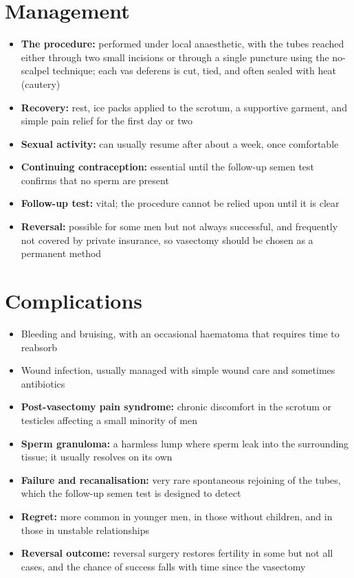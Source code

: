 \section*{Management}
\begin{itemize}
    \item \textbf{The procedure:} performed under local anaesthetic, with the tubes reached either through two small incisions or through a single puncture using the no-scalpel technique; each vas deferens is cut, tied, and often sealed with heat (cautery)
    \item \textbf{Recovery:} rest, ice packs applied to the scrotum, a supportive garment, and simple pain relief for the first day or two
    \item \textbf{Sexual activity:} can usually resume after about a week, once comfortable
    \item \textbf{Continuing contraception:} essential until the follow-up semen test confirms that no sperm are present
    \item \textbf{Follow-up test:} vital; the procedure cannot be relied upon until it is clear
    \item \textbf{Reversal:} possible for some men but not always successful, and frequently not covered by private insurance, so vasectomy should be chosen as a permanent method
\end{itemize}

\section*{Complications}
\begin{itemize}
    \item Bleeding and bruising, with an occasional haematoma that requires time to reabsorb
    \item Wound infection, usually managed with simple wound care and sometimes antibiotics
    \item \textbf{Post-vasectomy pain syndrome:} chronic discomfort in the scrotum or testicles affecting a small minority of men
    \item \textbf{Sperm granuloma:} a harmless lump where sperm leak into the surrounding tissue; it usually resolves on its own
    \item \textbf{Failure and recanalisation:} very rare spontaneous rejoining of the tubes, which the follow-up semen test is designed to detect
    \item \textbf{Regret:} more common in younger men, in those without children, and in those in unstable relationships
    \item \textbf{Reversal outcome:} reversal surgery restores fertility in some but not all cases, and the chance of success falls with time since the vasectomy
\end{itemize}

